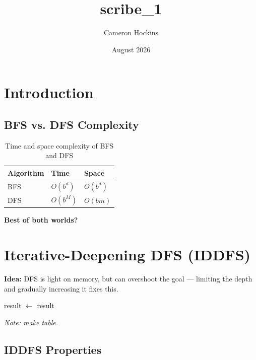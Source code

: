 \documentclass{article}
\title{scribe\_1}
\author{Cameron Hockins}
\date{August 2026}
\begin{document}
\maketitle

\section{Introduction}

\subsection{BFS vs. DFS Complexity}

\begin{table}[h]
\centering
\begin{tabular}{@{}lll@{}}
\toprule
\textbf{Algorithm} & \textbf{Time} & \textbf{Space} \\
\midrule
BFS & $O(b^d)$ & $O(b^d)$ \\
DFS & $O(b^M)$ & $O(bm)$ \\
\bottomrule
\end{tabular}
\caption{Time and space complexity of BFS and DFS}
\end{table}

\textbf{Best of both worlds?}

\section{Iterative-Deepening DFS (IDDFS)}

\textbf{Idea:} DFS is light on memory, but can overshoot the goal --- limiting the depth and gradually increasing it fixes this.

\begin{algorithm}[h]
\caption{Iterative-Deepening Search}
\begin{algorithmic}[1]
        \State result $\leftarrow$ 
            \State \Return result
        \EndIf
    \EndFor
\EndFunction
\end{algorithmic}
\end{algorithm}

\textit{Note: make table.}

\subsection{IDDFS Properties}
\end{document}
